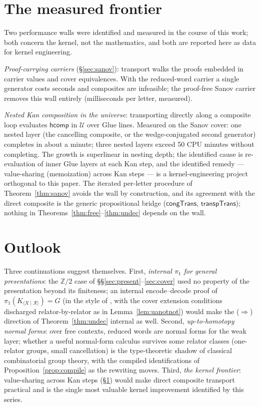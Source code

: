 \documentclass[11pt]{amsart}
\theoremstyle{definition}
\newcommand{\U}{\mathcal{U}}
\newcommand{\hcomp}{\mathsf{hcomp}}
\begin{document}
\section{The measured frontier}
\label{sec:frontier}

Two performance walls were identified and measured in the course of
this work; both concern the kernel, not the mathematics, and both
are reported here as data for kernel engineering.

\emph{Proof-carrying carriers} (\S\ref{sec:sanov}): transport walks
the proofs embedded in carrier values and cover equivalences.  With
the reduced-word carrier a single generator costs seconds and
composites are infeasible; the proof-free Sanov carrier removes this
wall entirely (milliseconds per letter, measured).

\emph{Nested Kan composition in the universe}: transporting
directly along a composite loop evaluates $\hcomp$ in $\U$ over
Glue lines.  Measured on the Sanov cover: one nested layer (the
cancelling composite, or the wedge-conjugated second generator)
completes in about a minute; three nested layers exceed 50 CPU
minutes without completing.  The growth is superlinear in nesting
depth; the identified cause is re-evaluation of inner Glue layers at
each Kan step, and the identified remedy --- value-sharing
(memoization) across Kan steps --- is a kernel-engineering project
orthogonal to this paper.  The iterated per-letter procedure of
Theorem~\ref{thm:sanov} avoids the wall by construction, and its
agreement with the direct composite is the generic propositional
bridge ($\mathsf{congTrans}$, $\mathsf{transpTrans}$); nothing in
Theorems~\ref{thm:free}--\ref{thm:undec} depends on the wall.

\section{Outlook}
\label{sec:outlook}

Three continuations suggest themselves.  First, \emph{internal
$\pi_1$ for general presentations}: the $\mathbb{Z}/2$ case of
\S\S\ref{sec:present}--\ref{sec:cover} used no property of the
presentation beyond its finiteness; an internal encode--decode proof
of $\pi_1(K_{\langle X \mid \mathcal{R} \rangle}) = G$ (in the style
of \cite{LicataShulman}, with the cover extension conditions
discharged relator-by-relator as in Lemma~\ref{lem:uanotnot}) would
make the ($\Rightarrow$) direction of Theorem~\ref{thm:undec}
internal as well.  Second, \emph{up-to-homotopy normal forms}: over
free contexts, reduced words are normal forms for the weak layer;
whether a useful normal-form calculus survives some relator classes
(one-relator groups, small cancellation) is the type-theoretic
shadow of classical combinatorial group theory, with the compiled
identifications of Proposition~\ref{prop:compile} as the rewriting
moves.  Third, \emph{the kernel frontier}: value-sharing across Kan
steps (\S\ref{sec:frontier}) would make direct composite transport
practical and is the single most valuable kernel improvement
identified by this series.
\end{document}
